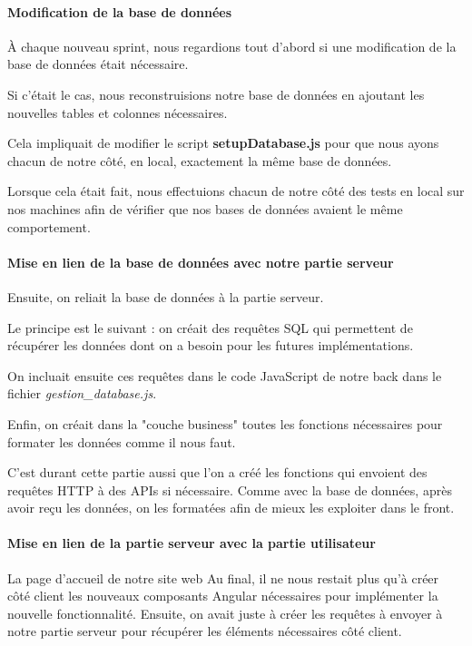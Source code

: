 \documentclass[12pt,french]{article}
\begin{document}
\paragraph{Modification de la base de données \\}

À chaque nouveau sprint, nous regardions tout d'abord si une modification de la base de données était nécessaire.

Si c'était le cas, nous reconstruisions notre base de données en ajoutant les nouvelles tables et colonnes nécessaires.

Cela impliquait de modifier le script \textbf{setupDatabase.js} pour que nous ayons chacun de notre côté, en local, exactement la même base de données.

Lorsque cela était fait, nous effectuions chacun de notre côté des tests en local sur nos machines afin de vérifier que nos bases de données avaient le même comportement.

\paragraph{Mise en lien de la base de données avec notre partie serveur \\}

Ensuite, on reliait la base de données à la partie serveur.

\medskip

Le principe est le suivant : on créait des requêtes SQL qui permettent de récupérer les données dont on a besoin pour les futures implémentations.

On incluait ensuite ces requêtes dans le code JavaScript de notre back dans le fichier \textit{gestion\_database.js}.

Enfin, on créait dans la "couche business" toutes les fonctions nécessaires pour formater les données comme il nous faut.

C'est durant cette partie aussi que l'on a créé les fonctions qui envoient des requêtes HTTP à des APIs si nécessaire. Comme avec la base de données, après avoir reçu les données, on les formatées afin de mieux les exploiter dans le front.

\paragraph{Mise en lien de la partie serveur avec la partie utilisateur\\}
La page d'accueil de notre site web
Au final, il ne nous restait plus qu'à créer côté client les nouveaux composants Angular nécessaires pour implémenter la nouvelle fonctionnalité. Ensuite, on avait juste à créer les requêtes à envoyer à notre partie serveur pour récupérer les éléments nécessaires côté client.
\end{document}
